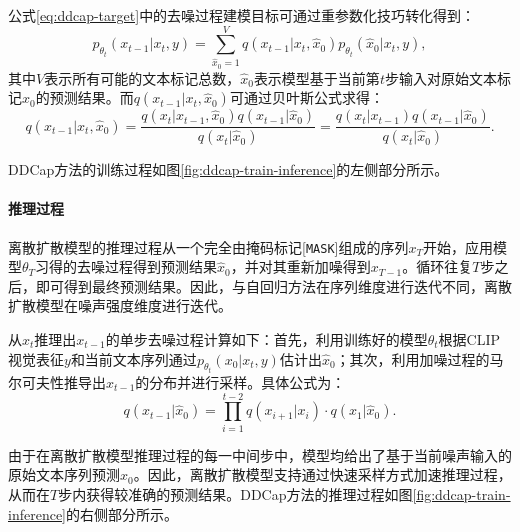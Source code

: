 公式\eqref{eq:ddcap-target}中的去噪过程建模目标可通过重参数化技巧\cite{VQ-diffusion}转化得到：
\begin{equation}
    p_{\theta_t}(x_{t-1} | x_{t}, y)=\sum_{\hat{x}_0=1}^{V}q(x_{t-1}|x_{t},\hat{x}_0)p_{\theta_t}(\hat{x}_0 | x_{t}, y),
\end{equation}
其中$V$表示所有可能的文本标记总数，$\hat{x}_0$表示模型基于当前第$t$步输入对原始文本标记$x_{0}$的预测结果。而$q(x_{t-1}|x_{t},\hat{x}_0)$可通过贝叶斯公式求得：
\begin{equation}
    q(x_{t-1}|x_{t},\hat{x}_0)=\frac{q(x_{t}|x_{t-1},\hat{x}_0)q(x_{t-1}|\hat{x}_0)}{q(x_{t}|\hat{x}_0)}=\frac{q(x_{t}|x_{t-1})q(x_{t-1}|\hat{x}_0)}{q(x_{t}|\hat{x}_0)}.
\end{equation}

DDCap方法的训练过程如图\ref{fig:ddcap-train-inference}的左侧部分所示。

\paragraph{推理过程} 离散扩散模型的推理过程从一个完全由掩码标记[\texttt{MASK}]组成的序列$x_{T}$开始，应用模型$\theta_{T}$习得的去噪过程得到预测结果$\hat{x}_{0}$，并对其重新加噪得到$x_{T-1}$。循环往复$T$步之后，即可得到最终预测结果。因此，与自回归方法在序列维度进行迭代不同，离散扩散模型在噪声强度维度进行迭代。

从$x_{t}$推理出$x_{t-1}$的单步去噪过程计算如下：首先，利用训练好的模型$\theta_t$根据CLIP视觉表征$y$和当前文本序列通过$p_{\theta_t}(x_{0} | x_{t}, y)$估计出$\hat{x}_{0}$；其次，利用加噪过程的马尔可夫性推导出$x_{t-1}$的分布并进行采样。具体公式为：
\begin{equation}
    q(x_{t-1} | \hat{x}_{0})=\prod \limits_{i=1}^{t-2} q(x_{i+1} | x_i)\cdot q(x_1 | \hat{x}_{0}).
\end{equation}

由于在离散扩散模型推理过程的每一中间步中，模型均给出了基于当前噪声输入的原始文本序列预测$\hat{x}_{0}$。因此，离散扩散模型支持通过快速采样方式加速推理过程，从而在$T$步内获得较准确的预测结果。DDCap方法的推理过程如图\ref{fig:ddcap-train-inference}的右侧部分所示。

